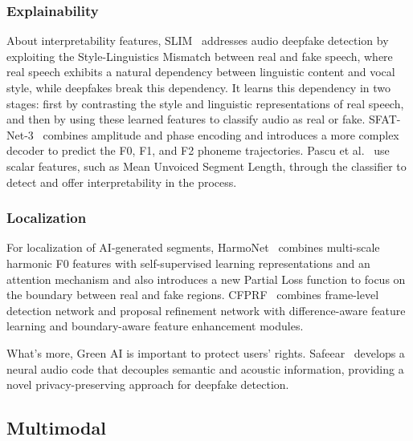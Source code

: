\subsubsection{\textbf{Explainability}} About interpretability features, SLIM~\cite{zhu2024slim} addresses audio deepfake detection by exploiting the Style-Linguistics Mismatch between real and fake speech, where real speech exhibits a natural dependency between linguistic content and vocal style, while deepfakes break this dependency. It learns this dependency in two stages: first by contrasting the style and linguistic representations of real speech, and then by using these learned features to classify audio as real or fake.
SFAT-Net-3~\cite{cuccovillo2024audio} combines amplitude and phase encoding and introduces a more complex decoder to predict the F0, F1, and F2 phoneme trajectories.
Pascu et al.~\cite{pascu2024easy} use scalar features, such as Mean Unvoiced Segment Length, through the classifier to detect and offer interpretability in the process. 

\subsubsection{\textbf{Localization}}
For localization of AI-generated segments,
HarmoNet~\cite{liu2024harmonet} combines multi-scale harmonic F0 features with self-supervised learning representations and an attention mechanism and also introduces a new Partial Loss function to focus on the boundary between real and fake regions.
CFPRF~\cite{wu2024coarse} combines frame-level detection network and proposal refinement network with difference-aware feature learning and boundary-aware feature enhancement modules.

What's more, Green AI is important to protect users' rights.
Safeear~\cite{li2024safeear} develops a neural audio code that decouples semantic and acoustic information, providing a novel privacy-preserving approach for deepfake detection. 



\subsection{Multimodal}
